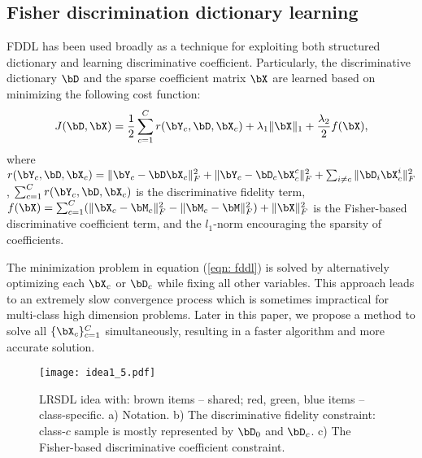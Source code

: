 \documentclass[letterpaper]{article}
\begin{document}
\subsection{Fisher discrimination dictionary learning} %
\label{sub:fisher_discrimination_dictionary_learning}
FDDL\cite{Meng2011FDDL} has been used broadly as a technique for exploiting both structured dictionary and learning discriminative coefficient. Particularly, the discriminative dictionary $\bD$ and the sparse coefficient matrix $\bX$ are learned based on minimizing the following cost function:
\vspace{-0.1in}
\begin{eqnarray}
\label{eqn: fddl}
    J(\bD, \bX) = \frac{1}{2}\sum_{c=1}^C r(\bY_c, \bD, \bX_c) + \lambda_1\|\bX\|_1 + \frac{\lambda_2}{2} f(\bX),
\end{eqnarray}
where  $r(\bY_c, \bD, \bX_c) = \|\bY_c - \bD\bX_c\|_F^2 +  \|\bY_c - \bD_c\bX_c^c\|_F^2 + \sum_{i\neq c}\|\bD_i\bX^i_c\|_F^2$, $\sum_{c=1}^Cr(\bY_c, \bD, \bX_c)$ is the discriminative fidelity term, $f(\bX) = \sum_{c=1}^C (\|\bX_c - \bM_c\|_F^2 - \|\bM_c - \bM\|_F^2) + \|\bX\|_F^2$ is the Fisher-based discriminative coefficient term, and the $l_1$-norm encouraging the sparsity of coefficients.
\par The minimization problem in equation (\ref{eqn: fddl}) is solved by alternatively optimizing each $\bX_c$ or $\bD_c$ while fixing all other variables. This approach leads to an extremely slow convergence process which is sometimes impractical for multi-class high dimension problems. Later in this paper, we propose a method to solve all $\{\bX_c\}_{c=1}^{C}$ simultaneously, resulting in a faster algorithm and more accurate solution.

\begin{figure}[t]
\centering
\texttt{[image: idea1\_5.pdf]}
\caption{\small LRSDL idea with: brown items -- shared; red, green, blue items -- class-specific. a) Notation. b) The discriminative fidelity constraint: class-$c$ sample is mostly represented by $\bD_0$ and $\bD_c$. c) The Fisher-based discriminative coefficient constraint.}
\label{fig:sddlidea}
\end{figure}
\end{document}
